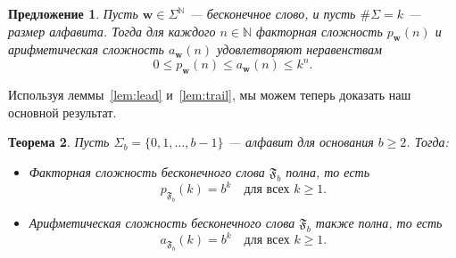 \documentclass[a4paper,14pt]{extreport}
\theoremstyle{plain}
\newtheorem{theorem}{Теорема}[section]
\newtheorem{proposition}[theorem]{Предложение}
\theoremstyle{definition}
\theoremstyle{remark}
\begin{document}
\begin{proposition}\label{p03}
	Пусть $\mathbf{w} \in \Sigma^{\mathbb{N}}$ --- бесконечное слово, и пусть $\#\Sigma = k$ --- размер алфавита. Тогда для каждого $n \in \mathbb{N}$ факторная сложность $p_{\mathbf{w}}(n)$ и арифметическая сложность $a_{\mathbf{w}}(n)$ удовлетворяют неравенствам
	\begin{equation}
		0 \leq p_{\mathbf{w}}(n) \leq a_{\mathbf{w}}(n) \leq k^{n}.
	\end{equation}
\end{proposition}

Используя леммы~\ref{lem:lead} и~\ref{lem:trail}, мы можем теперь доказать наш основной результат.

\begin{theorem}\label{mainthm01}
	Пусть $\Sigma_{b} = \{0,1,\dots,b-1\}$ --- алфавит для основания $b \geq 2$. Тогда:
	\begin{itemize}
		\item[(i)] Факторная сложность бесконечного слова $\mathfrak{F}_{b}$ полна, то есть
		\begin{equation}
			p_{\mathfrak{F}_{b}}(k) = b^{k} \quad \text{для всех } k \geq 1.
		\end{equation}
		\item[(ii)] Арифметическая сложность бесконечного слова $\mathfrak{F}_{b}$ также полна, то есть
		\begin{equation}
			a_{\mathfrak{F}_{b}}(k) = b^{k} \quad \text{для всех } k \geq 1.
		\end{equation}
	\end{itemize}
\end{theorem}
\end{document}
